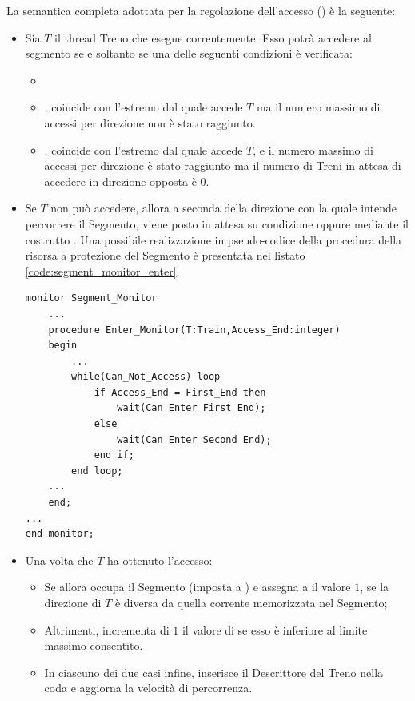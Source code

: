 \begin{description}
		La semantica completa adottata per la regolazione dell'accesso () è la seguente:
		\begin{itemize}
			\item Sia $T$ il thread Treno che esegue correntemente. Esso potrà accedere al segmento se e soltanto se una delle seguenti condizioni è verificata:
				\begin{itemize}
					\item {}
					\item {},  coincide con l'estremo dal quale accede $T$ ma il numero massimo di accessi per direzione non è stato raggiunto.
					\item {},  coincide con l'estremo dal quale accede $T$, e il numero massimo di accessi per direzione è stato raggiunto ma il numero di Treni in attesa di accedere in direzione opposta è 0.
				\end{itemize}
			\item Se $T$ non può accedere, allora a seconda della direzione con la quale intende percorrere il Segmento, viene posto in attesa su condizione  oppure  mediante il costrutto . Una possibile realizzazione in pseudo-codice della procedura  della risorsa  a protezione del Segmento è presentata nel listato \ref{code:segment_monitor_enter}.
\begin{lstlisting}[caption=\small{Procedura protetta \ttt{Enter\_Monitor} per l'accesso al Segmento.},label=code:segment_monitor_enter]
monitor Segment_Monitor
	...
	procedure Enter_Monitor(T:Train,Access_End:integer) 
	begin
		...
		while(Can_Not_Access) loop
			if Access_End = First_End then
				wait(Can_Enter_First_End);
			else
				wait(Can_Enter_Second_End);
			end if;
		end loop;
	...
	end;
...	
end monitor;
\end{lstlisting}
			\item Una volta che $T$ ha ottenuto l'accesso:
				\begin{itemize}
					\item Se  allora occupa il Segmento (imposta  a ) e assegna a  il valore $1$, se la direzione di $T$ è diversa da quella corrente memorizzata nel Segmento;
					\item Altrimenti, incrementa di $1$ il valore di  se esso è inferiore al limite massimo consentito.
					\item In ciascuno dei due casi infine, inserisce il Descrittore del Treno nella coda  e aggiorna la velocità di percorrenza.
				\end{itemize}
		\end{itemize}
			

\end{description}
